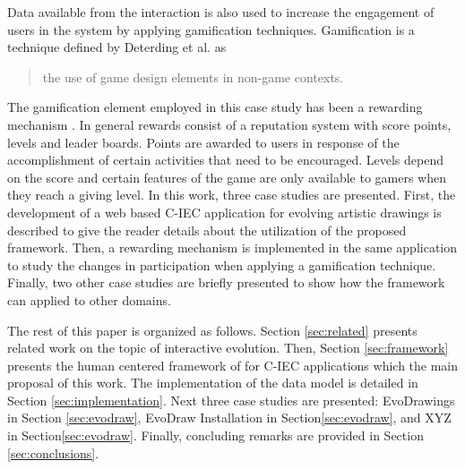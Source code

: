 Data available from the interaction is also used to increase the engagement of 
users in the system by applying  gamification techniques. Gamification
is a technique defined by 
Deterding et al. \cite{deterding2011game} as
\begin{quote}
  the use of game design elements in non-game contexts.
\end{quote}  
The gamification element employed in this case study has been a rewarding mechanism  
\cite{dubois2013understanding}. In general rewards  consist of a reputation system 
with score points, levels and leader boards. Points are awarded to users in response of 
the accomplishment of certain activities that need to be encouraged. Levels depend
on the score and certain features of the game are only available to gamers when 
they reach a giving level. %
In this work, three case studies are presented. First, the development of a web based C-IEC application 
for evolving artistic drawings is described to give the reader details about 
the utilization of the proposed framework. Then, a rewarding mechanism is 
implemented in the same application to study the changes in participation
when applying a gamification technique. Finally, two other case studies are briefly presented
to show how the framework can applied to other domains. %

The rest of this paper is organized as follows.
Section \ref{sec:related} presents related work on the topic 
of interactive evolution. Then, Section \ref{sec:framework} presents the human centered framework of
for C-IEC applications which the main proposal of this work. The implementation of the data model
is detailed in Section \ref{sec:implementation}. %
Next three case studies are presented: EvoDrawings in
Section \ref{sec:evodraw}, EvoDraw Installation in Section\ref{sec:evodraw}, 
and XYZ in Section\ref{sec:evodraw}. Finally, concluding remarks are provided 
in Section \ref{sec:conclusions}.

